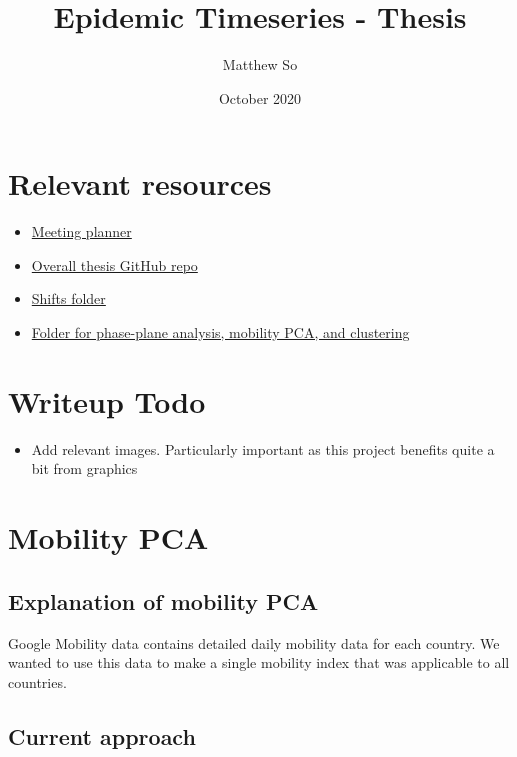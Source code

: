 \documentclass{article}
\title{Epidemic Timeseries - Thesis}
\author{Matthew So}
\date{October 2020}
\begin{document}
\maketitle

\tableofcontents


\section{Relevant resources}

\begin{itemize}
    \item \hyperlink{https://docs.google.com/document/d/105QZAGMzl7m6JZiXGLuycXWrZcsydqJ_/edit}{Meeting planner} 
    \item \hyperlink{https://github.com/Apeirogons/COVID-math-thesis}{Overall thesis GitHub repo}
    \item \hyperlink{https://github.com/Apeirogons/COVID-math-thesis/tree/master/shifts}{Shifts folder}
    \item \hyperlink{https://github.com/Apeirogons/COVID-math-thesis/tree/master/visualizations}{Folder for phase-plane analysis, mobility PCA, and clustering}    
\end{itemize}


\section{Writeup Todo}
\begin{itemize}
    \item Add relevant images. Particularly important as this project benefits quite a bit from graphics
    
\end{itemize}

\section{Mobility PCA}
\subsection{Explanation of mobility PCA}
Google Mobility data contains detailed daily mobility data for each country. We wanted to use this data to make a single mobility index that was applicable to all countries.

\subsection{Current approach}
\end{document}
